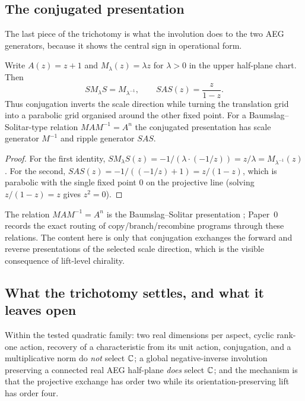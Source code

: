 \subsection{The conjugated presentation}

The last piece of the trichotomy is what the involution does to the two AEG
generators, because it shows the central sign in operational form.

\begin{proposition}\label{prop:conjugated-generators}
Write $A(z)=z+1$ and $M_\lambda(z)=\lambda z$ for $\lambda>0$ in the upper
half-plane chart.  Then
\[
  S M_\lambda S=M_{\lambda^{-1}},\qquad
  S A S(z)=\frac{z}{1-z}.
\]
Thus conjugation inverts the scale direction while turning the translation grid into a
parabolic grid organised around the other fixed point.  For a Baumslag--Solitar-type
relation $MAM^{-1}=A^{n}$ the conjugated presentation has scale generator $M^{-1}$ and
ripple generator $SAS$.
\end{proposition}

\begin{proof}
For the first identity, $S M_\lambda S(z)=-1/(\lambda\cdot(-1/z))=z/\lambda
=M_{\lambda^{-1}}(z)$.  For the second,
$SAS(z)=-1/((-1/z)+1)=z/(1-z)$, which is parabolic with the single fixed point $0$
on the projective line (solving $z/(1-z)=z$ gives $z^{2}=0$).
\end{proof}

\begin{remark}
The relation $MAM^{-1}=A^{n}$ is the Baumslag--Solitar presentation
\cite{BaumslagSolitar1962NonHopfian}; Paper~0 records the exact routing of
copy/branch/recombine programs through these relations.  The content here is only that
conjugation exchanges the forward and reverse presentations of the selected scale
direction, which is the visible consequence of lift-level chirality.
\end{remark}

\subsection{What the trichotomy settles, and what it leaves open}

\begin{calibration}\label{cal:trichotomy-bounded}
Within the tested quadratic family: two real dimensions per aspect, cyclic rank-one
action, recovery of a characteristic from its unit action, conjugation, and a
multiplicative norm do \emph{not} select $\mathbb{C}$; a global negative-inverse involution
preserving a connected real AEG half-plane \emph{does} select $\mathbb{C}$; and the
mechanism is that the projective exchange has order two while its
orientation-preserving lift has order four.
\end{calibration}

